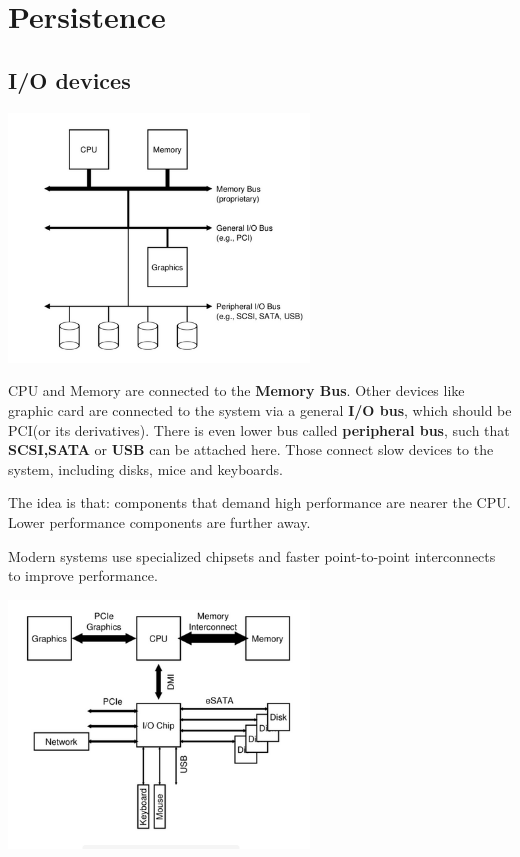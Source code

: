 \chapter{Persistence}

    \section{I/O devices}


    \includegraphics[width=0.6\textwidth]{chapters/Persistence/persistence/psa.png}

    CPU and Memory are connected to the \textbf{Memory Bus}. Other devices like graphic card 
    are connected to the system via a general \textbf{I/O bus}, which should 
    be PCI(or its derivatives). There is even lower bus called \textbf{peripheral bus}, such that 
    \textbf{SCSI,SATA} or \textbf{USB} can be attached here. Those connect slow devices to the 
    system, including disks, mice and keyboards.

    The idea is that: components that demand high performance are nearer the CPU. Lower 
    performance components are further away.



    Modern systems use specialized chipsets and faster point-to-point interconnects to 
    improve performance.

    \includegraphics[width=0.6\textwidth]{chapters/Persistence/persistence/msa.png}

    

